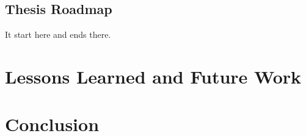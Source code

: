 \documentclass{ucbthesis}
\begin{document}
\section{Thesis Roadmap}
It start here and ends there.





% 

\chapter{Lessons Learned and Future Work}
\chapter{Conclusion}


\printbibliography
\end{document}
